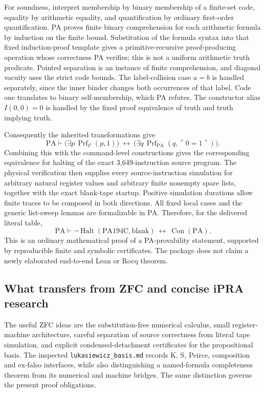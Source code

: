 For soundness, interpret membership by binary membership of a finite-set
code, equality by arithmetic equality, and quantification by ordinary
first-order quantification.  PA proves finite binary comprehension for
each arithmetic formula by induction on the finite bound.  Substitution
of the formula syntax into that fixed induction-proof template gives a
primitive-recursive proof-producing operation whose correctness PA
verifies; this is not a uniform arithmetic truth predicate.  Pointed
separation is an instance of finite comprehension, and diagonal vacuity
uses the strict code bounds.  The label-collision case $a=b$ is handled
separately, since the inner binder changes both occurrences of that label.
Code one translates to binary self-membership, which PA refutes.  The
constructor alias $I(0,0)=0$ is handled by the fixed proof equivalence of
truth and truth implying truth.

Consequently the inherited transformations give
\[
 \mathrm{PA}\vdash
 \bigl(\exists p\,\operatorname{Prf}_{\mathcal C}(p,1)\bigr)
 \ \longleftrightarrow\
 \bigl(\exists q\,\operatorname{Prf}_{\mathrm{PA}}
                         (q,\ulcorner0=1\urcorner)\bigr).
\]
Combining this with the command-level constructions gives the corresponding
equivalence for halting of the exact 3,649-instruction source program.
The physical verification then supplies every source-instruction simulation
for arbitrary natural register values and arbitrary finite nonempty spare
lists, together with the exact blank-tape startup.  Positive simulation
durations allow finite traces to be composed in both directions.  All
fixed local cases and the generic list-sweep lemmas are formalizable in PA.
Therefore, for the delivered literal table,
\[
 \boxed{\displaystyle
 \mathrm{PA}\vdash
 \neg\operatorname{Halt}(\mathrm{PA194C},\mathrm{blank})
 \ \longleftrightarrow\ \operatorname{Con}(\mathrm{PA}).}
\]
This is an ordinary mathematical proof of a PA-provability statement,
supported by reproducible finite and symbolic certificates.  The package
does not claim a newly elaborated end-to-end Lean or Rocq theorem.

\subsection{What transfers from ZFC and concise iPRA research}

The useful ZFC ideas are the substitution-free numerical calculus,
small register-machine architecture, careful separation of source
correctness from literal tape simulation, and explicit condensed-detachment
certificates for the propositional basis.  The inspected
\texttt{lukasiewicz\_basis.md} records K, S, Peirce, composition and
ex-falso interfaces, while also distinguishing a named-formula completeness
theorem from its numerical and machine bridges.  The same distinction
governs the present proof obligations.

